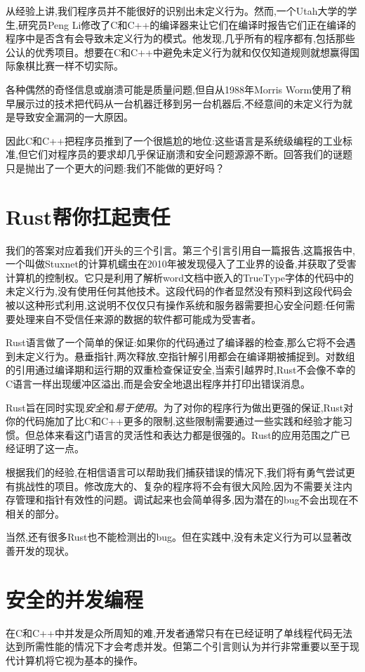 从经验上讲,我们程序员并不能很好的识别出未定义行为。然而,一个Utah大学的学生,研究员Peng Li修改了C和C++的编译器来让它们在编译时报告它们正在编译的程序中是否含有会导致未定义行为的模式。他发现,几乎所有的程序都有,包括那些公认的优秀项目。想要在C和C++中避免未定义行为就和仅仅知道规则就想赢得国际象棋比赛一样不切实际。

各种偶然的奇怪信息或崩溃可能是质量问题,但自从1988年Morris Worm使用了稍早展示过的技术把代码从一台机器迁移到另一台机器后,不经意间的未定义行为就是导致安全漏洞的一大原因。

因此C和C++把程序员推到了一个很尴尬的地位:这些语言是系统级编程的工业标准,但它们对程序员的要求却几乎保证崩溃和安全问题源源不断。回答我们的谜题只是抛出了一个更大的问题:我们不能做的更好吗？

\section{Rust帮你扛起责任}
我们的答案对应着我们开头的三个引言。第三个引言引用自一篇报告,这篇报告中,一个叫做Stuxnet的计算机蠕虫在2010年被发现侵入了工业界的设备,并获取了受害计算机的控制权。它只是利用了解析word文档中嵌入的TrueType字体的代码中的未定义行为,没有使用任何其他技术。这段代码的作者显然没有预料到这段代码会被以这种形式利用,这说明不仅仅只有操作系统和服务器需要担心安全问题:任何需要处理来自不受信任来源的数据的软件都可能成为受害者。

Rust语言做了一个简单的保证:如果你的代码通过了编译器的检查,那么它将不会遇到未定义行为。悬垂指针,两次释放,空指针解引用都会在编译期被捕捉到。对数组的引用通过编译期和运行期的双重检查保证安全,当索引越界时,Rust不会像不幸的C语言一样出现缓冲区溢出,而是会安全地退出程序并打印出错误消息。

Rust旨在同时实现\emph{安全}和\emph{易于使用}。为了对你的程序行为做出更强的保证,Rust对你的代码施加了比C和C++更多的限制,这些限制需要通过一些实践和经验才能习惯。但总体来看这门语言的灵活性和表达力都是很强的。Rust的应用范围之广已经证明了这一点。

根据我们的经验,在相信语言可以帮助我们捕获错误的情况下,我们将有勇气尝试更有挑战性的项目。修改庞大的、复杂的程序将不会有很大风险,因为不需要关注内存管理和指针有效性的问题。调试起来也会简单得多,因为潜在的bug不会出现在不相关的部分。

当然,还有很多Rust也不能检测出的bug。但在实践中,没有未定义行为可以显著改善开发的现状。

\section{安全的并发编程}
在C和C++中并发是众所周知的难,开发者通常只有在已经证明了单线程代码无法达到所需性能的情况下才会考虑并发。但第二个引言则认为并行非常重要以至于现代计算机将它视为基本的操作。

